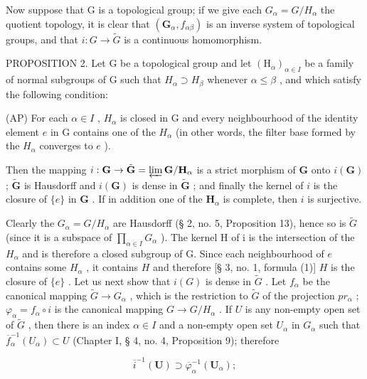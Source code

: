 Now suppose that G is a topological group; if we give each \(G_{\alpha} = G/H_{\alpha}\) the quotient topology, it is clear that \((\mathbf{G}_{\alpha}, f_{\alpha\beta})\) is an inverse system of topological groups, and that \(i : G \to \tilde{G}\) is a continuous homomorphism.

PROPOSITION 2. Let G be a topological group and let \((\mathrm{H}_{\alpha})_{\alpha\in I}\) be a family of normal subgroups of G such that \(H_{\alpha}\supset H_{\beta}\) whenever \(\alpha\leqslant\beta\) , and which satisfy the following condition:

(AP) For each \(\alpha \in I\) , \(H_{\alpha}\) is closed in G and every neighbourhood of the identity element \(e\) in G contains one of the \(H_{\alpha}\) (in other words, the filter base formed by the \(H_{\alpha}\) converges to \(e\) ).

Then the mapping \(i: \mathbf{G} \to \tilde{\mathbf{G}} = \varprojlim \mathbf{G} / \mathbf{H}_{\alpha}\) is a strict morphism of \(\mathbf{G}\) onto \(i(\mathbf{G})\) ; \(\tilde{\mathbf{G}}\) is Hausdorff and \(i(\mathbf{G})\) is dense in \(\tilde{\mathbf{G}}\) ; and finally the kernel of \(i\) is the closure of \(\{e\}\) in \(\mathbf{G}\) . If in addition one of the \(\mathbf{H}_{\alpha}\) is complete, then \(i\) is surjective.

Clearly the \(G_{\alpha} = G/H_{\alpha}\) are Hausdorff (§ 2, no. 5, Proposition 13), hence so is \(\tilde{G}\) (since it is a subspace of \(\prod_{\alpha \in I} G_{\alpha}\) ). The kernel H of i is the intersection of the \(H_{\alpha}\) and is therefore a closed subgroup of G. Since each neighbourhood of \(e\) contains some \(H_{\alpha}\) , it contains \(H\) and therefore {[}§ 3, no. 1, formula (1){]} \(H\) is the closure of \(\{e\}\) . Let us next show that \(i(G)\) is dense in \(\tilde{G}\) . Let \(f_{\alpha}\) be the canonical mapping \(\tilde{G} \to G_{\alpha}\) , which is the restriction to \(\tilde{G}\) of the projection \(pr_{\alpha}\) ; \(\varphi_{\alpha} = f_{\alpha} \circ i\) is the canonical mapping \(G \to G / H_{\alpha}\) . If \(U\) is any non-empty open set of \(\tilde{G}\) , then there is an index \(\alpha \in I\) and a non-empty open set \(U_{\alpha}\) in \(G_{\alpha}\) such that \(\overline{f}_{\alpha}^{-1}(U_{\alpha}) \subset U\) (Chapter I, § 4, no. 4, Proposition 9); therefore

\[
\overline {{i}} ^ {-1} (\mathbf {U}) \supset \overline {{\varphi}} _ {\alpha} ^ {-1} (\mathbf {U} _ {\alpha});
\]

